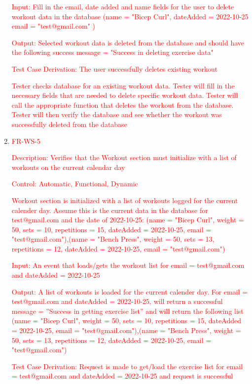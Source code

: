 \documentclass[12pt, titlepage]{article}
\begin{document}
\begin{enumerate}
	\textcolor{red}{Input: Fill in the email, date added and name fields for the user to delete workout data in the database (name = "Bicep Curl", dateAdded = 2022-10-25 email = "test@gmail.com" )}
	
	\textcolor{red}{Output: Selected workout data is deleted from the database and should have the following success message = "Success in deleting exercise data"}
	
	\textcolor{red}{Test Case Derivation: The user successfully deletes existing workout}
	
	\textcolor{red}{Tester checks database for an existing workout data. Tester will fill in the necessary fields that are needed to delete specific workout data. Tester will call the appropriate function that deletes the workout from the database. Tester will then verify the database and see whether the workout was successfully deleted from the database}

   \item{\textcolor{red}{FR-WS-5\\}}

 \textcolor{red}{Description: Verifies that the Workout section must initialize with a list of workouts on the current calendar day}
	
	\textcolor{red}{Control: Automatic, Functional, Dynamic}
	
	\textcolor{red}{Workout section is initialized with a list of workouts logged for the current calender day. Assume this is the current data in the database for test@gmail.com and the date of 2022-10-25: (name = "Bicep Curl", weight = 50, sets = 10, repetitions = 15, dateAdded = 2022-10-25, email = "test@gmail.com"),(name = "Bench Press", weight = 50, sets = 13, repetitions = 12, dateAdded = 2022-10-25, email = "test@gmail.com")}
	
	\textcolor{red}{Input: An event that loads/gets the workout list for email = test@gmail.com and dateAdded = 2022-10-25}
	
	\textcolor{red}{Output: A list of workouts is loaded for the current calender day. For email = test@gmail.com and dateAdded = 2022-10-25, will return a successful message = ”Success in getting exercise list” and will return the following list (name = "Bicep Curl", weight = 50, sets = 10, repetitions = 15, dateAdded = 2022-10-25, email = "test@gmail.com"),(name = "Bench Press", weight = 50, sets = 13, repetitions = 12, dateAdded = 2022-10-25, email = "test@gmail.com")}
	
	\textcolor{red}{Test Case Derivation: Request is made to get/load the exercise list for email = test@gmail.com and dateAdded = 2022-10-25 and request is successful}
	

\end{enumerate}
\end{document}
